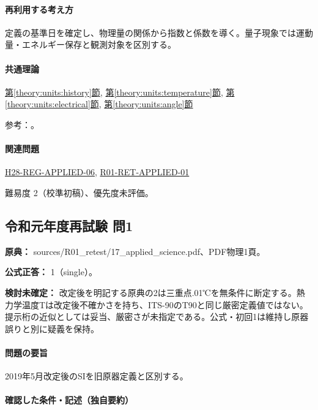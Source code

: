 \paragraph{再利用する考え方} 定義の基準日を確定し、物理量の関係から指数と係数を導く。量子現象では運動量・エネルギー保存と観測対象を区別する。

\paragraph{共通理論} \hyperref[theory:units:history]{第\ref*{theory:units:history}節}, \hyperref[theory:units:temperature]{第\ref*{theory:units:temperature}節}, \hyperref[theory:units:electrical]{第\ref*{theory:units:electrical}節}, \hyperref[theory:units:angle]{第\ref*{theory:units:angle}節}

\par 参考：\cite{si_kelvin2007,si_nist811,si_cgpm2018}。

\paragraph{関連問題} \hyperref[q:h28-reg-applied-06]{H28-REG-APPLIED-06}, \hyperref[q:r01-ret-applied-01]{R01-RET-APPLIED-01}

\par 難易度 2（校準初稿）、優先度未評価。

\subsection{令和元年度再試験 問1}
\label{q:r01-ret-applied-01}

\noindent\textbf{原典：} sources/R01\_retest/17\_applied\_science.pdf、PDF物理1頁。

\textbf{公式正答：} 1（single）。

\par\textbf{検討未確定：} 改定後を明記する原典の2は三重点.01℃を無条件に断定する。熱力学温度Tは改定後不確かさを持ち、ITS-90のT90と同じ厳密定義値ではない。提示桁の近似としては妥当、厳密さが未指定である。公式・初回1は維持し原器誤りと別に疑義を保持。

\paragraph{問題の要旨} 2019年5月改定後のSIを旧原器定義と区別する。

\paragraph{確認した条件・記述（独自要約）}\mbox{}\par

